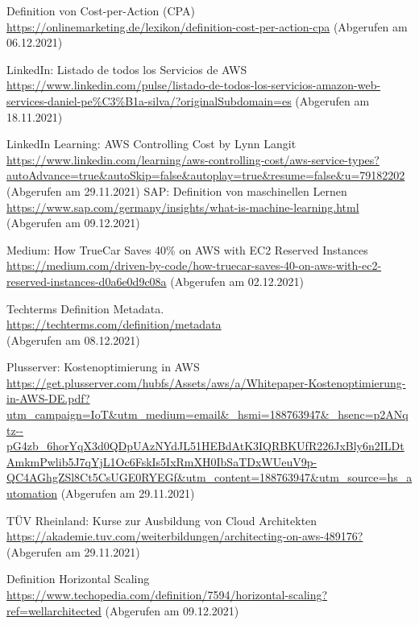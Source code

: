 \begin{thebibliography}{HR08}
  Definition von Cost-per-Action (CPA)\\
 \url{https://onlinemarketing.de/lexikon/definition-cost-per-action-cpa}
 (Abgerufen am 06.12.2021)
 
  LinkedIn: Listado de todos los Servicios de AWS\\
 \url{https://www.linkedin.com/pulse/listado-de-todos-los-servicios-amazon-web-services-daniel-pe%C3%B1a-silva/?originalSubdomain=es}
 (Abgerufen am 18.11.2021)

  LinkedIn Learning: AWS Controlling Cost by Lynn Langit\\
 \url{https://www.linkedin.com/learning/aws-controlling-cost/aws-service-types?autoAdvance=true&autoSkip=false&autoplay=true&resume=false&u=79182202}
 (Abgerufen am 29.11.2021)
 SAP: Definition von maschinellen Lernen\\
 \url{https://www.sap.com/germany/insights/what-is-machine-learning.html}
 (Abgerufen am 09.12.2021)

 Medium: How TrueCar Saves 40\% on AWS with EC2 Reserved Instances\\
 \url{https://medium.com/driven-by-code/how-truecar-saves-40-on-aws-with-ec2-reserved-instances-d0a6e0d9c08a}
 (Abgerufen am 02.12.2021)
 
  Techterms Definition Metadata.\\
 \url{https://techterms.com/definition/metadata}\\
 (Abgerufen am 08.12.2021)

  Plusserver: Kostenoptimierung in AWS\\
 \url{https://get.plusserver.com/hubfs/Assets/aws/a/Whitepaper-Kostenoptimierung-in-AWS-DE.pdf?utm_campaign=IoT&utm_medium=email&_hsmi=188763947&_hsenc=p2ANqtz--pG4zb_6horYqX3d0QDpUAzNYdJL51HEBdAtK3IQRBKUfR226JxBly6n2ILDtAmkmPwlib5J7qYjL1Oc6FskIs5IxRmXH0IbSaTDxWUeuV9p-QC4AGhgZSl8Ct5CsUGE0RYEGf&utm_content=188763947&utm_source=hs_automation}
 (Abgerufen am 29.11.2021)

  TÜV Rheinland: Kurse zur Ausbildung von Cloud Architekten\\
 \url{https://akademie.tuv.com/weiterbildungen/architecting-on-aws-489176?}
 (Abgerufen am 29.11.2021)

   Definition Horizontal Scaling\\
 \url{https://www.techopedia.com/definition/7594/horizontal-scaling?ref=wellarchitected}
 (Abgerufen am 09.12.2021)


\end{thebibliography}
